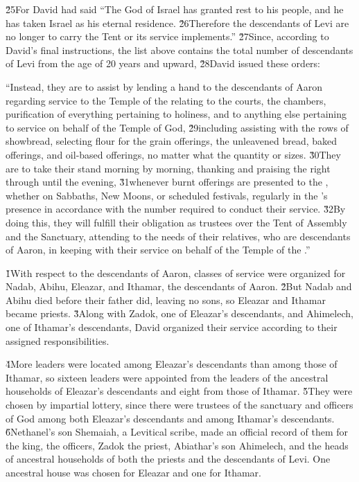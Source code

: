 \v{25}For David had said ``The  God of Israel has granted rest to his people, and he has taken Israel as his eternal residence. \v{26}Therefore the descendants of Levi are no longer to carry the Tent or its service implements.'' \v{27}Since, according to David's final instructions, the list above contains the total number of descendants of Levi from the age of 20 years and upward, \v{28}David issued these orders:

\begin{poetry}
\poeml ``Instead, they are to assist by lending a hand to the descendants of Aaron regarding service to the Temple of the  relating to the courts, the chambers, purification of everything pertaining to holiness, and to anything else pertaining to service on behalf of the Temple of God, \v{29}including assisting with the rows of showbread, selecting flour for the grain offerings, the unleavened bread, baked offerings, and oil-based offerings, no matter what the quantity or sizes. \v{30}They are to take their stand morning by morning, thanking and praising the  right through until the evening, \v{31}whenever burnt offerings are presented to the , whether on Sabbaths, New Moons, or scheduled festivals, regularly in the 's presence in accordance with the number required to conduct their service. \v{32}By doing this, they will fulfill their obligation as trustees over the Tent of Assembly and the Sanctuary, attending to the needs of their relatives, who are descendants of Aaron, in keeping with their service on behalf of the Temple of the .''
\end{poetry}

\v{1}With respect to the descendants of Aaron, classes of service were organized for Nadab, Abihu, Eleazar, and Ithamar, the descendants of Aaron. \v{2}But Nadab and Abihu died before their father did, leaving no sons, so Eleazar and Ithamar became priests. \v{3}Along with Zadok, one of Eleazar's descendants, and Ahimelech, one of Ithamar's descendants, David organized their service according to their assigned responsibilities.

\v{4}More leaders were located among Eleazar's descendants than among those of Ithamar, so sixteen leaders were appointed from the leaders of the ancestral households of Eleazar's descendants and eight from those of Ithamar. \v{5}They were chosen by impartial lottery, since there were trustees of the sanctuary and officers of God among both Eleazar's descendants and among Ithamar's descendants. \v{6}Nethanel's son Shemaiah, a Levitical scribe, made an official record of them for the king, the officers, Zadok the priest, Abiathar's son Ahimelech, and the heads of ancestral households of both the priests and the descendants of Levi. One ancestral house was chosen for Eleazar and one for Ithamar.


